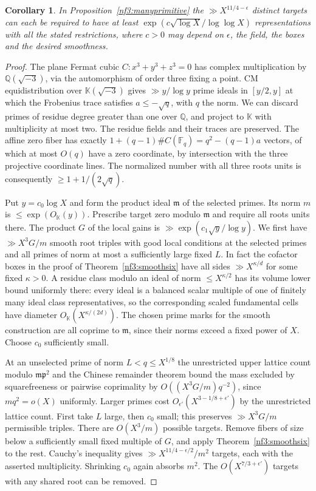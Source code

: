 \documentclass[11pt,letterpaper]{article}
\newtheorem{corollary}[corollary]{Corollary}
\theoremstyle{definition}
\numberwithin{equation}{section}
\begin{document}
\begin{corollary}\label{nf3:growing-fibres}
In Proposition~\ref{nf3:manyprimitive} the $\gg X^{11/4-\epsilon}$
distinct targets can each be required to have at least
$\exp(c\sqrt{\log X}/\log\log X)$ representations with all the
stated restrictions, where $c>0$ may depend on $\epsilon$,
the field, the boxes and the desired smoothness.
\end{corollary}
\begin{proof}
The plane Fermat cubic $C:x^3+y^3+z^3=0$ has complex multiplication
by $\mathbb Q(\sqrt{-3})$, via the automorphism of order three
fixing a point. CM equidistribution
\cite[Corollary~3.8]{nf3:fitesutherland} over
$\mathbb K(\sqrt{-3})$ gives $\gg y/\log y$ prime ideals in
$[y/2,y]$ at which the Frobenius trace satisfies $a\le-\sqrt q$,
with $q$ the norm. We can discard primes of residue degree
greater than one over $\mathbb Q$, and project to $\mathbb K$
with multiplicity at most two. The residue fields and their
traces are preserved. The affine zero fiber has exactly
$1+(q-1)\#C(\mathbb F_q)=q^2-(q-1)a$ vectors, of which at
most $O(q)$ have a zero coordinate, by intersection with the
three projective coordinate lines. The normalized number with
all three roots units is consequently $\ge1+1/(2\sqrt q)$.

Put $y=c_0\log X$ and form the product ideal $\mathfrak m$ of the
selected primes. Its norm $m$ is $\le\exp(O_{\mathbb K}(y))$.
Prescribe target zero modulo $\mathfrak m$ and require all roots
units there. The product $G$ of the local gains is
$\gg\exp(c_1\sqrt y/\log y)$. We first have
$\gg X^3G/m$ smooth root triples with good local conditions at the
selected primes and all primes of norm at most a sufficiently
large fixed $L$. In fact the cofactor boxes in the proof of
Theorem~\ref{nf3:smoothsix} have all sides
$\gg X^{\kappa/d}$ for some fixed $\kappa>0$. A residue class
modulo an ideal of norm $\le X^{\kappa/2}$ has its volume
lower bound uniformly there: every ideal is a balanced scalar
multiple of one of finitely many ideal class representatives,
so the corresponding scaled fundamental cells have diameter
$O_{\mathbb K}(X^{\kappa/(2d)})$. The chosen prime marks for the
smooth construction are all coprime to $\mathfrak m$, since their
norms exceed a fixed power of $X$. Choose $c_0$ sufficiently small.

At an unselected prime of norm $L<q\le X^{1/8}$ the
unrestricted upper lattice count modulo $\mathfrak m\mathfrak p^2$
and the Chinese remainder theorem bound the mass excluded by
squarefreeness or pairwise coprimality by
$O((X^3G/m)q^{-2})$, since $m q^2=o(X)$ uniformly.
Larger primes cost $O_{\epsilon'}(X^{3-1/8+\epsilon'})$
by the unrestricted lattice count. First take $L$ large, then
$c_0$ small; this preserves $\gg X^3G/m$ permissible triples.
There are $O(X^3/m)$ possible targets. Remove fibers of size
below a sufficiently small fixed multiple of $G$, and apply
Theorem~\ref{nf3:smoothsix} to the rest. Cauchy's inequality gives
$\gg X^{11/4-\epsilon/2}/m^2$ targets, each with the asserted
multiplicity. Shrinking $c_0$ again absorbs $m^2$. The
$O(X^{7/3+\epsilon'})$ targets with any shared root can be removed.


\end{proof}
\end{document}
